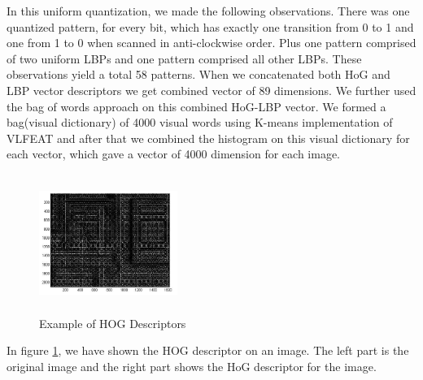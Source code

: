 In this uniform quantization, we made the following observations. There 
was one quantized pattern, for every bit, which has exactly one 
transition from 0 to 1 and one from 1 to 0 when scanned in 
anti-clockwise order. Plus one pattern comprised of two uniform 
LBPs and one pattern comprised all other LBPs. These observations 
yield a total 58 patterns. When we concatenated both HoG and LBP 
vector descriptors we get combined vector of 89 dimensions. We further used
the bag of words approach on this combined HoG-LBP vector. We formed a bag(visual dictionary)
of 4000 visual words using K-means implementation of VLFEAT and after that we combined the 
histogram on this visual dictionary for each vector, which gave a 
vector of 4000 dimension for each image.
 \begin{center}
\begin{figure}
\centering
\includegraphics[width=4.5cm, height=4.5cm]{./Pictures/HOG/hogFeatures.jpg}
\caption{Example of HOG Descriptors}
\label{fig:hogExample}
\end{figure}
\end{center}
In figure \ref{fig:hogExample}, we have  shown the HOG descriptor on 
an image. The left part is the original image and the right part shows 
the HoG descriptor for the image.

